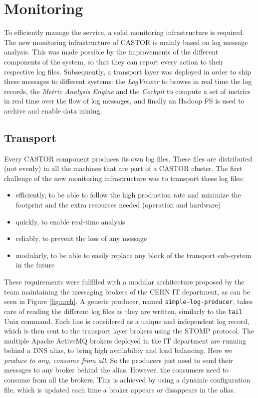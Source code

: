 \section{Monitoring}

To efficiently manage the service, a solid monitoring infrastructure is required. The new monitoring infrastructure of CASTOR is mainly based on log message analysis. This was made possible by the improvements of the different components of the system, so that they can report every action to their respective log files. Subsequently, a transport layer was deployed in order to ship these messages to different systems: the {\it LogViewer} to browse in real time the log records, the {\it Metric Analysis Engine} and the {\it Cockpit} to compute a set of metrics in real time over the flow of log messages, and finally an Hadoop FS is used to archive and enable data mining.


\subsection{Transport}

Every CASTOR component produces its own log files. These files are distributed (not evenly) in all the machines that are part of a CASTOR cluster. The first challenge of the new monitoring infrastructure was to transport these log files:
\begin{itemize}
\item efficiently, to be able to follow the high production rate and minimize the footprint and the extra resources needed (operation and hardware)
\item quickly, to enable real-time analysis
\item reliably, to prevent the loss of any message
\item modularly, to be able to easily replace any block of the transport sub-system in the future
\end{itemize}
These requirements were fulfilled with a modular architecture proposed by the team maintaining the messaging brokers of the CERN IT department, as can be seen in Figure \ref{fig:arch}.
A generic producer, named \texttt{simple-log-producer}, takes care of reading the different log files as they are written, similarly to the \texttt{tail} Unix command. Each line is considered as a unique and independent log record, which is then sent to the transport layer brokers using the STOMP protocol.
The multiple Apache ActiveMQ brokers deployed in the IT department are running behind a DNS alias, to bring high availability and load balancing. Here we \textit{produce to any, consume from all}. So the producers just need to send their messages to any broker behind the alias. However, the consumers need to consume from all the brokers. This is achieved by using a dynamic configuration file, which is updated each time a broker appears or disappears in the alias.

